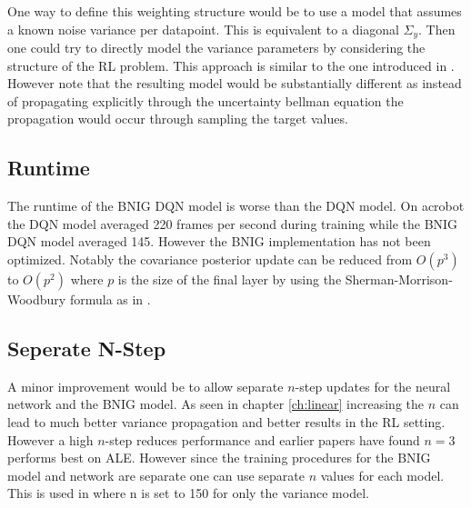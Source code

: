 One way to define this weighting structure would be to use a model that assumes a known noise variance per datapoint. This is equivalent to a diagonal $\Sigma_y$. Then one could try to directly model the variance parameters by considering the structure of the RL problem. This approach is similar to the one introduced in \cite{donoghue_2017}. However note that the resulting model would be substantially different as instead of propagating explicitly through the uncertainty bellman equation the propagation would occur through sampling the target values.

\subsection{Runtime}

The runtime of the BNIG DQN model is worse than the DQN model. On acrobot the DQN model averaged 220 frames per second during training while the BNIG DQN model averaged 145. However the BNIG implementation has not been optimized. Notably the covariance posterior update can be reduced from $O(p^3)$ to $O(p^2)$ where $p$ is the size of the final layer by using the Sherman-Morrison-Woodbury formula as in \cite{donoghue_2017}.

\subsection{Seperate N-Step}

A minor improvement would be to allow separate $n$-step updates for the neural network and the BNIG model. As seen in chapter \ref{ch:linear} increasing the $n$ can lead to much better variance propagation and better results in the RL setting. However a high $n$-step reduces performance and earlier papers have found $n=3$ performs best on ALE\citep{hessel_2017}. However since the training procedures for the BNIG model and network are separate one can use separate $n$ values for each model. This is used in \cite{donoghue_2017} where n is set to 150 for only the variance model.

\cleardoublepage